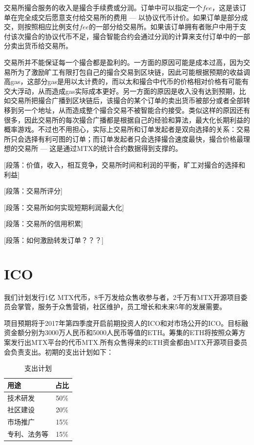 \documentclass[UTF8,nofonts]{ctexart}
\begin{document}
交易所撮合服务的收入是撮合手续费或分润。订单中可以指定一个$fee$，这是该订单在完全成交后愿意支付给交易所的费用 --- 以协议代币计价。如果订单是部分成交，则按照相应比例支付$fee$的一部分给交易所。如果该订单拥有者账户中用于支付该次撮合的协议代币不足，撮合智能合约会通过分润的计算来支付订单中的一部分卖出货币给交易所。

交易所并不能保证每一个撮合都是盈利的。一方面的原因可能是成本过高，因为交易所为了激励旷工有限打包自己的撮合交易到区块链，因此可能根据预期的收益调高gas，这部分gas是用以太计费的，而以太和撮合中代币的价格相对价格有可能有交大浮动，从而造成gas实际成本更好。另一方面的原因是收入没有达到预期，比如交易所把撮合广播到区块链后，该撮合的某个订单的卖出货币被部分或者全部转移到另一个地址，从而造成整个撮合交易不被智能合约接受。类似这样的原因还有很多，因此交易所的每次撮合广播都是根据自己的经验和算法，最大化长期利益的概率游戏。不过也不用担心，实际上交易所和订单发起者是双向选择的关系：交易所只会选择有利可图的订单；而订单发起者只会选择撮合速度最快，撮合价格最理想的交易所 --- 这是通过MTX的统计合约数据得到支撑的。

[段落：价值，收入，相互竞争，交易所时间和利润的平衡，旷工对撮合的选择和利益]

[段落：交易所评分]

[段落：交易所如何实现短期利润最大化]

[段落：交易所的信用积累]



[段落：如何激励转发订单？？？]


\section{ICO\label{sec:ico}}

我们计划发行1亿 MTX代币，8千万发给众售收参与者，2千万有MTX开源项目委员会掌管，服务于众售营销，社区维护，员工增长和未来5年的发展需要。

项目预期将于2017年第四季度开启前期投资人的ICO和对市场公开的ICO。目标融资金额分别为3000万人民币和5000人民币等值的ETH。筹集的ETH将按照众筹方案发行出MTX平台的代币MTX.所有众售得来的ETH资金都由MTX开源项目委员会负责支出。初期的支出计划如下：

\begin{table}[hbt]
  \centering
  \begin{tabular}{l|c}
 用途   & 占比\\
    \hline
  技术研发 & 50\% \\
  社区建设 & 20\% \\
  市场推广 & 15\% \\
  专利、法务等 & 15\% \\
  \end{tabular}
  \caption{支出计划}
\end{table}
\end{document}
